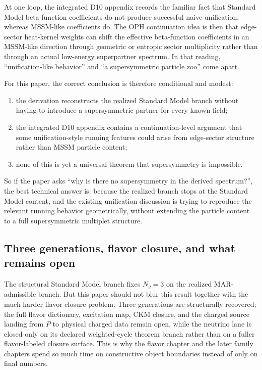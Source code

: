 \documentclass[11pt]{article}
\begin{document}
At one loop, the integrated D10 appendix records the familiar fact that Standard Model beta-function
coefficients do not produce successful naive unification, whereas MSSM-like coefficients do. The
OPH continuation idea is then that edge-sector heat-kernel weights can shift the effective
beta-function coefficients in an MSSM-like direction through geometric or entropic sector
multiplicity rather than through an actual low-energy superpartner spectrum. In that reading,
``unification-like behavior'' and ``a supersymmetric particle zoo'' come apart.

For this paper, the correct conclusion is therefore conditional and modest:
\begin{enumerate}[leftmargin=2em]
\item the derivation reconstructs the realized Standard Model branch without having to
introduce a supersymmetric partner for every known field;
\item the integrated D10 appendix contains a continuation-level argument that some unification-style running
features could arise from edge-sector structure rather than MSSM particle content;
\item none of this is yet a universal theorem that supersymmetry is impossible.
\end{enumerate}

So if the paper asks ``why is there no supersymmetry in the derived spectrum?'', the best
technical answer is: because the realized branch stops at the Standard
Model content, and the existing unification discussion is trying to reproduce the relevant
running behavior geometrically, without extending the particle content to a full
supersymmetric multiplet structure.

\subsection{Three generations, flavor closure, and what remains open}

The structural Standard Model branch fixes \(N_g=3\) on the realized MAR-admissible
branch. But this paper should not blur this result together with the much harder flavor
closure problem. Three generations are structurally recovered; the full flavor dictionary,
excitation map, CKM closure, and the charged source landing from \(P\) to physical charged data remain open, while the neutrino
lane is closed only on its declared weighted-cycle theorem branch rather than on a fuller
flavor-labeled closure surface.
This is why the flavor chapter and the later family chapters spend so much time on
constructive object boundaries instead of only on final numbers.
\end{document}

